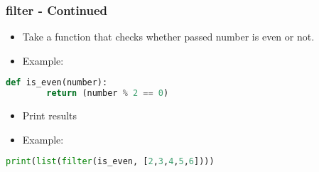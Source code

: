 \documentclass[14pt]{beamer}
\begin{document}
    \begin{frame}[containsverbatim]
        \frametitle{filter - Continued}
		\begin{itemize}
		\item Take a function that checks whether passed number is even or not.
        \item \alert{Example:}
        \end{itemize}
        \begin{lstlisting}[language=Python]
	def is_even(number):
		return (number % 2 == 0)
        \end{lstlisting}
		\begin{itemize}
		\item Print results
        \item \alert{Example:}
        \end{itemize}
        \begin{lstlisting}[language=Python]
print(list(filter(is_even, [2,3,4,5,6])))
        \end{lstlisting}

    \end{frame}
    
\end{document}
